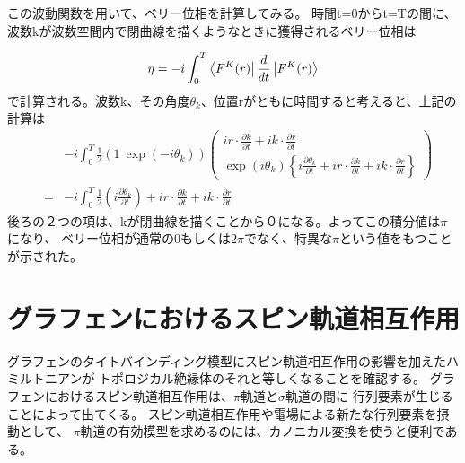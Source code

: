 \documentclass{article}
\begin{document}
この波動関数を用いて、ベリー位相を計算してみる。
時間t=0からt=Tの間に、波数kが波数空間内で閉曲線を描くようなときに獲得されるベリー位相は

\begin{eqnarray}
\eta=-i \int^T_0 \Bra{F^K(r)} \frac{d}{dt} \Ket{F^K(r)}
\end{eqnarray}
で計算される。波数k、その角度$\theta_k$、位置rがともに時間すると考えると、上記の計算は
\begin{eqnarray}
&&-i \int^T_0 \frac{1}{2} (1 \:  \exp(-i\theta_k))  
\left( 
 \begin{array}{c}
	ir\cdot \frac{\partial k}{\partial t}+ik\cdot  \frac{\partial r}{\partial t} \\
	\exp(i\theta_k)\left \{  i\frac{\partial \theta_k}{\partial t}+ir\cdot\frac{\partial k}{\partial t}+ik\cdot  \frac{\partial r}{\partial t}\right \}
 \end{array}
\right)  \\
&=&-i \int^T_0 \frac{1}{2}\left( i\frac{\partial \theta_k}{\partial t} \right)+ir\cdot\frac{\partial k}{\partial t}+ik\cdot  \frac{\partial r}{\partial t}
\end{eqnarray}
後ろの２つの項は、kが閉曲線を描くことから０になる。よってこの積分値は$\pi$になり、
ベリー位相が通常の0もしくは$2\pi$でなく、特異な$\pi$という値をもつことが示された。


\section{グラフェンにおけるスピン軌道相互作用}
グラフェンのタイトバインディング模型にスピン軌道相互作用の影響を加えたハミルトニアンが
トポロジカル絶縁体のそれと等しくなることを確認する。
グラフェンにおけるスピン軌道相互作用は、$\pi$軌道と$\sigma$軌道の間に
行列要素が生じることによって出てくる。
スピン軌道相互作用や電場による新たな行列要素を摂動として、
$\pi$軌道の有効模型を求めるのには、カノニカル変換を使うと便利である。
\end{document}
